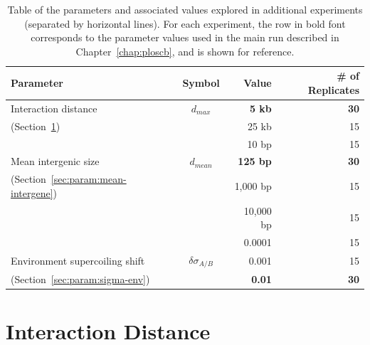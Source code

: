 \begin{table}[H]
\begin{center}
\begin{tabular}{l c r r}
\toprule
\textbf{Parameter} & \textbf{Symbol} & \textbf{Value} & \textbf{\# of Replicates} \\
\midrule
Interaction distance & $d_{max}$ & \textbf{5 kb} & \textbf{30}\\
(Section~\ref{sec:param:inter25k}) & & 25 kb & 15\\
\midrule
& & 10 bp& 15\\
Mean intergenic size & $d_{mean}$ & \textbf{125 bp} & \textbf{30} \\
(Section~\ref{sec:param:mean-intergene})& & 1,000 bp & 15\\
& & 10,000 bp & 15 \\
\midrule
& & 0.0001 & 15\\
Environment supercoiling shift & $\delta\sigma_{A/B}$ & 0.001 & 15\\
(Section~\ref{sec:param:sigma-env})& & \textbf{0.01} & \textbf{30}\\
\bottomrule
\end{tabular}
\end{center}
\caption[Table of parameter values explored in additional \emph{EvoTSC} simulations]{Table of the parameters and associated values explored in additional experiments (separated by horizontal lines).
For each experiment, the row in bold font corresponds to the parameter values used in the main run described in Chapter~\ref{chap:ploscb}, and is shown for reference.}
\label{tab:param:params}
\end{table}

\section{Interaction Distance}
\label{sec:param:inter25k}

